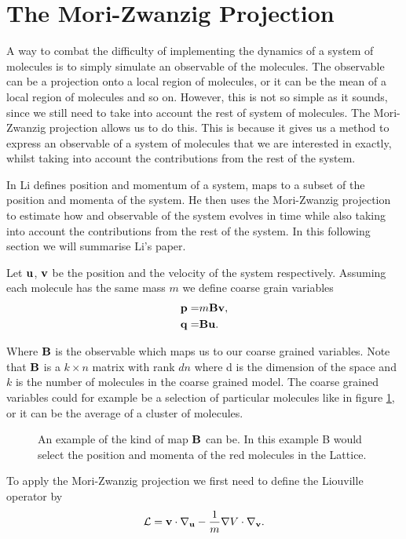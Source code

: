 \section{The Mori-Zwanzig Projection}
A way to combat the difficulty of implementing the dynamics of a system of molecules is to simply simulate an observable of the molecules. The observable can be a projection onto a local region of molecules, or it can be the mean of a local region of molecules and so on. However, this is not so simple as it sounds, since we still need to take into account the rest of system of molecules. The Mori-Zwanzig projection allows us to do this. This is because it gives us a method to express an observable of a system of molecules that we are interested in exactly, whilst taking into account the contributions from the rest of the system. 

In \citep{Li2010} Li defines position and momentum of a system, maps to a subset of the position and momenta of the system. He then uses the Mori-Zwanzig projection to estimate how and observable of the system evolves in time while also taking into account the contributions from the rest of the system. In this following section we will summarise Li's paper.

Let $\mathbf{u}$, $\mathbf{v}$ be the position and the velocity of the system respectively. Assuming each molecule has the same mass $m$ we define coarse grain variables
\begin{align*}
\mathbf{p} =& m\mathbf{B}\mathbf{v},\\
\mathbf{q} =& \mathbf{B}\mathbf{u}.
\end{align*}

Where $\mathbf{B}$ is the observable which maps us to our coarse grained variables. Note that $\mathbf{B}$ is a $k\times n$ matrix with rank $dn$ where d is the dimension of the space and $k$ is the number of molecules in the coarse grained model. The coarse grained variables could for example be a selection of particular molecules like in figure \ref{figure:2}, or it can be the average of a cluster of molecules.\\


\begin{figure}[h]\label{figure:2}
\centering
\def\svgscale{0.35}

\caption{An example of the kind of map $\mathbf{B}$ can be. In this example B would select the position and momenta of the red molecules in the Lattice. }
\end{figure}

To apply the Mori-Zwanzig projection we first need to define the Liouville operator by
\begin{align*}
\mathbf{\mathcal{L}} = \mathbf{v} \cdot \nabla_{\mathbf{u}} - \frac{1}{m}\nabla V \cdot\nabla_{\mathbf{v}}.
\end{align*}

